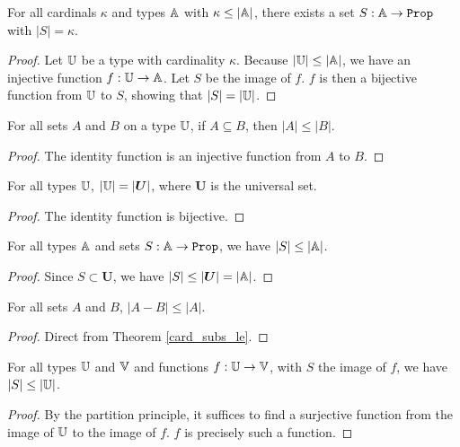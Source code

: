 \documentclass[../../math.tex]{subfiles}
\begin{document}
\begin{theorem} \label{card_le_sub}
    For all cardinals $\kappa$ and types $\mathbb{A}$ with $\kappa \leq |\mathbb{A}|$, there
    exists a set $S : \A \to \Prop$ with $|S| = \kappa$.
\end{theorem}
\begin{proof}
    Let $\mathbb{U}$ be a type with cardinality $\kappa$.  Because $|\mathbb{U}| \leq |\mathbb{A}|$, we
    have an injective function $f : \mathbb{U} \to \mathbb{A}$.  Let $S$ be the image of $f$.
    $f$ is then a bijective function from $\mathbb{U}$ to $S$, showing that $|S| =
    |\mathbb{U}|$.
\end{proof}

\begin{theorem} \label{card_subs_le}
    For all sets $A$ and $B$ on a type $\mathbb{U}$, if $A \subseteq B$, then $|A| \leq
    |B|$.
\end{theorem}
\begin{proof}
    The identity function is an injective function from $A$ to $B$.
\end{proof}

\begin{theorem} \label{card_all}
    For all types $\mathbb{U}$, $|\mathbb{U}| = |\bm U|$, where $\bm U$ is the universal set.
\end{theorem}
\begin{proof}
    The identity function is bijective.
\end{proof}

\begin{theorem} \label{card_sub_le}
    For all types $\mathbb{A}$ and sets $S : \A \to \Prop$, we have $|S| \leq |\mathbb{A}|$.
\end{theorem}
\begin{proof}
    Since $S \subset \bm U$, we have $|S| \leq |\bm U| = |\mathbb{A}|$.
\end{proof}

\begin{theorem} \label{card_minus_le}
    For all sets $A$ and $B$, $|A - B| \leq |A|$.
\end{theorem}
\begin{proof}
    Direct from Theorem \ref{card_subs_le}.
\end{proof}

\begin{theorem} \label{image_le}
    For all types $\mathbb{U}$ and $\mathbb{V}$ and functions $f : \mathbb{U} \to \mathbb{V}$, with $S$ the
    image of $f$, we have $|S| \leq |\mathbb{U}|$.
\end{theorem}
\begin{proof}
    By the partition principle, it suffices to find a surjective function from
    the image of $\mathbb{U}$ to the image of $f$.  $f$ is precisely such a function.
\end{proof}
\end{document}
